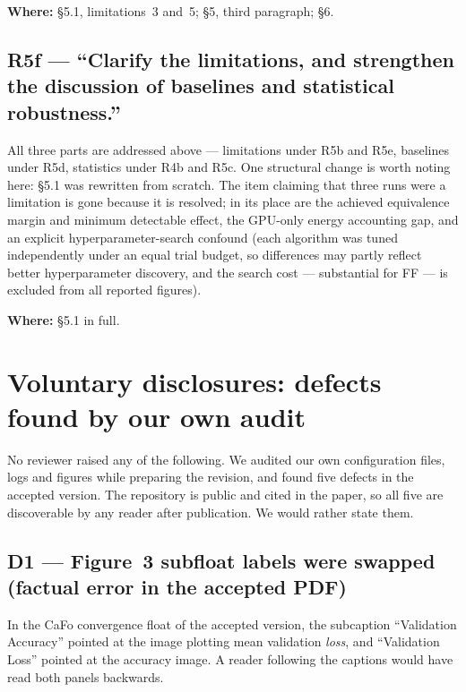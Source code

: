 \documentclass[11pt,a4paper]{article}
\newcommand{\FF}{FF}
\newcommand{\CaFo}{CaFo}
\newcommand{\where}[1]{\par\smallskip\noindent\textbf{Where:} #1\par}
\begin{document}
\where{\S5.1, limitations~3 and~5; \S5, third paragraph; \S6.}

\subsection*{R5f --- ``Clarify the limitations, and strengthen the discussion
of baselines and statistical robustness.''}

All three parts are addressed above --- limitations under R5b and R5e,
baselines under R5d, statistics under R4b and R5c. One structural change is
worth noting here: \S5.1 was rewritten from scratch. The item claiming that
three runs were a limitation is gone because it is resolved; in its place are
the achieved equivalence margin and minimum detectable effect, the GPU-only
energy accounting gap, and an explicit hyperparameter-search confound (each
algorithm was tuned independently under an equal trial budget, so differences
may partly reflect better hyperparameter discovery, and the search cost --- 
substantial for \FF{} --- is excluded from all reported figures).

\where{\S5.1 in full.}

\section*{Voluntary disclosures: defects found by our own audit}
\label{sec:disclosures}

\noindent
No reviewer raised any of the following. We audited our own configuration
files, logs and figures while preparing the revision, and found five defects
in the accepted version. The repository is public and cited in the paper, so
all five are discoverable by any reader after publication. We would rather
state them.

\subsection*{D1 --- Figure~3 subfloat labels were swapped (factual error in the
accepted PDF)}

In the \CaFo{} convergence float of the accepted version, the subcaption
``Validation Accuracy'' pointed at the image plotting mean validation
\emph{loss}, and ``Validation Loss'' pointed at the accuracy image. A reader
following the captions would have read both panels backwards.
\end{document}
